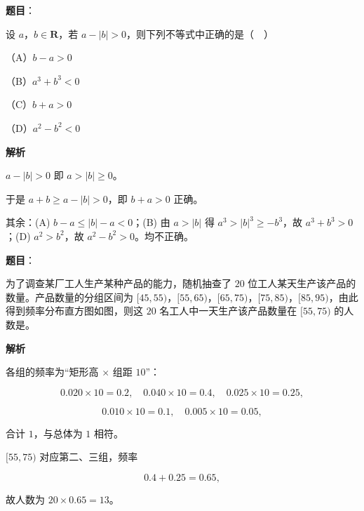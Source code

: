 \begin{answer}

\textbf{题目}：

设 $a$，$b\in\mathbf R$，若 $a-|b|>0$，则下列不等式中正确的是（　）

（A）$b-a>0$

（B）$a^3+b^3<0$

（C）$b+a>0$

（D）$a^2-b^2<0$

\textbf{解析}

$a-|b|>0$ 即 $a>|b|\geqslant0$。

于是 $a+b\geqslant a-|b|>0$，即 $b+a>0$ 正确。

其余：(A) $b-a\leqslant|b|-a<0$；(B) 由 $a>|b|$ 得 $a^3>|b|^3\geqslant-b^3$，故 $a^3+b^3>0$；(D) $a^2>b^2$，故 $a^2-b^2>0$。均不正确。


\end{answer}
\begin{answer}

\textbf{题目}：

为了调查某厂工人生产某种产品的能力，随机抽查了 $20$ 位工人某天生产该产品的数量。产品数量的分组区间为 $[45,55)$，$[55,65)$，$[65,75)$，$[75,85)$，$[85,95)$，由此得到频率分布直方图如图，则这 $20$ 名工人中一天生产该产品数量在 $[55,75)$ 的人数是\gkblank{}。
\nopagebreak[4]
\begin{center}\end{center}
\nopagebreak[4]
\textbf{解析}

各组的频率为“矩形高 $\times$ 组距 $10$”：

\nopagebreak[4]
\[0.020\times10=0.2,\quad 0.040\times10=0.4,\quad 0.025\times10=0.25,\]

\nopagebreak[4]
\[0.010\times10=0.1,\quad 0.005\times10=0.05,\]

合计 $1$，与总体为 $1$ 相符。

$[55,75)$ 对应第二、三组，频率

\nopagebreak[4]
\[0.4+0.25=0.65,\]

故人数为 $20\times0.65=13$。


\end{answer}
